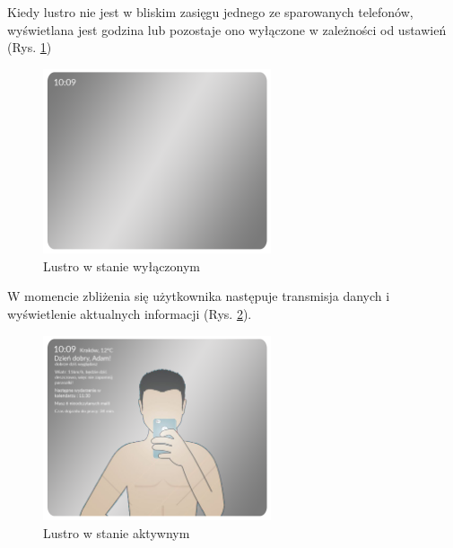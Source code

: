 \documentclass[a4paper,11pt]{article}
\begin{document}
Kiedy lustro nie jest w bliskim zasięgu jednego ze sparowanych telefonów, wyświetlana jest godzina lub pozostaje ono wyłączone w zależności od ustawień (Rys. \ref{lustro_off})

\begin{figure}[H]
	\includegraphics[width=0.6\textwidth,center]{mirror_off.png}
	\caption {Lustro w stanie wyłączonym}
	\label{lustro_off}
\end{figure}

W momencie zbliżenia się użytkownika następuje transmisja danych i wyświetlenie aktualnych informacji (Rys. \ref{lustro_on}).

\begin{figure}[H]
	\includegraphics[width=0.6\textwidth,center]{mirror_on.png}
	\caption {Lustro w stanie aktywnym}
	\label{lustro_on}
\end{figure}
\end{document}

